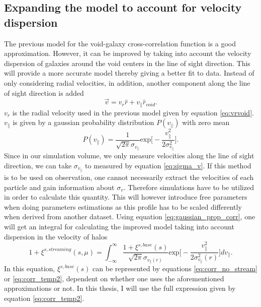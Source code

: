 \subsection{Expanding the model to account for velocity dispersion}
The previous model for the void-galaxy cross-correlation function is a good
approximation. However, it can be improved by taking into account the velocity
dispersion of galaxies around the void centers in the line of sight direction.
This will provide a more accurate model thereby giving a better fit to data.
Instead of only considering radial velocities, in addition, another component along the line
of sight direction is added
\begin{equation}
    \vec{v}=v_r\hat{r}+v_\parallel \hat{r}_{void}.
\end{equation}
$v_r$ is the radial velocity used in the previous model given by equation
\ref{eq:vrvoid}. $v_\parallel$ is given by a gaussian probability distribution
$P(v_{\vert\vert})$ with zero mean
\begin{equation}\label{eq:gaussian_prop_corr}
    P(v_\parallel)=\frac{1}{\sqrt{2\pi}\sigma_{v_{\parallel}}}\mathrm{exp}\Big[-\frac{v_\parallel^2}{2\sigma_{v_\parallel}^2}\Big].
\end{equation}
Since in our simulation volume, we only measure velocities along the line of
sight direction, we can take $\sigma_{v_{\parallel}}$ to measured by equation
\ref{eq:sigma_v}. If this method is to be used on observation, one cannot necessarily extract the velocities of each particle and gain information about $\sigma_v$. Therefore simulations have to be utilized in order to calculate this quantity. This will however introduce free parameters when doing parameters estimations as this profile has to be scaled differently when derived from another dataset. Using equation \ref{eq:gaussian_prop_corr}, one will get an integral for calculating the improved
model taking into account dispersion in the velocity of halos \cite{BeyondBAO}
\begin{equation}\label{eq:corr_stream}
    1+\xi^{s,streaming}(s,\mu)=\int_{-\infty}^\infty\frac{1+\xi^{s,base}(s)}{\sqrt{2\pi}\sigma_{v_{\parallel}(r)}}\mathrm{exp}\Big[-\frac{v_\parallel^2}{2\sigma_{v_\parallel}^2(r)}\Big]dv_\parallel.
\end{equation}
In this equation, $\xi^{s,base}(s)$ can be represented by equations \ref{eq:corr_no_stream} or \ref{eq:corr_temp2}, dependent on whether one uses the aforementioned approximations or not. In this thesis, I will use the full expression given by equation \ref{eq:corr_temp2}.
